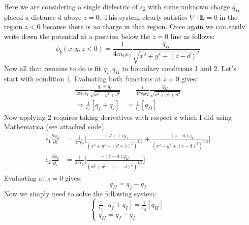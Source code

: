 \documentclass[a4paper, 11pt]{article}
\begin{document}
\noindent Here we are considering a single dielectric of $\epsilon_2$ with some unknown charge $q_{II}$ placed a distance d above $z=0$. This system clearly satisfies $\nabla \cdot \mathbf{E} = 0$ in the region $z<0$ because there is \textit{no} charge in that region. Once again we can easily write down the potential at a position below the $z=0$ line as follows: 
	\begin{equation}
		\phi_b(x,y,z<0) = \frac{1}{4\pi\epsilon_0\epsilon_1}\frac{q_{II}}{\sqrt{x^2+y^2+(z-d)^2}}
	\end{equation}
Now all that remains to do is fit $q_I, q_{II}$ to boundary conditions 1 and 2. Let's start with condition 1. Evaluating both functions at $z=0$ gives: 	
	\begin{align*}
		\frac{1}{4\pi\epsilon_0\epsilon_1}\frac{q_f+q_{I}}{\sqrt{x^2+y^2+d^2}} &= \frac{1}{4\pi\epsilon_0\epsilon_2}\frac{q_{II}}{\sqrt{x^2+y^2+d^2}} \\ 
		\Rightarrow \frac{1}{\epsilon_1}[q_f + q_I] &= \frac{1}{\epsilon_2}[q_{II}]
	\end{align*}
\noindent Now applying 2 requires taking derivatives with respect z which I did using Mathematica (see attached code). 
	\begin{align*}
		\epsilon_1\frac{\partial \phi_a}{\partial z} &= \frac{1}{4\pi\epsilon_0}\Bigg[ \frac{-(d+z)q_I}{(x^2+y^2+(d+z)^2)^{3/2}} + \frac{-(z-d)q_{f}}{(x^2+y^2+(z-d)^2)^{3/2}}\Bigg] \\ 
		\epsilon_2\frac{\partial \phi_b}{\partial_z} &= \frac{1}{4\pi\epsilon_0}\Bigg[\frac{-(z-d)q_{II}}{(x^2+y^2+(z-d)^2)^{3/2}}\Bigg]
	\end{align*}
Evaluating at $z=0$ gives: 
	\begin{equation*}
		q_{II} = q_f-q_I
	\end{equation*}
Now we simply need to solve the following system: 
	\begin{equation}
		\begin{cases}
			 \frac{1}{\epsilon_1}[q_f + q_I] = \frac{1}{\epsilon_2}[q_{II}] \\
			 q_{II} = q_f-q_I
		\end{cases}
	\end{equation}
	
\end{document}
